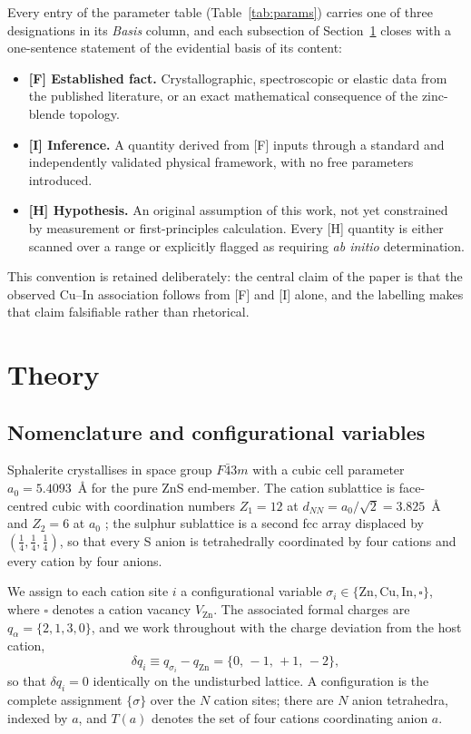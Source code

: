 \documentclass[11pt,a4paper]{article}
\begin{document}
Every entry of the parameter table (Table~\ref{tab:params}) carries one of three
designations in its \emph{Basis} column, and each subsection of
Section~\ref{sec:theory} closes with a one-sentence statement of the evidential
basis of its content:
\begin{itemize}\itemsep1pt
\item \textbf{[F] Established fact.} Crystallographic, spectroscopic or elastic
      data from the published literature, or an exact mathematical consequence
      of the zinc-blende topology.
\item \textbf{[I] Inference.} A quantity derived from [F] inputs through a
      standard and independently validated physical framework, with no free
      parameters introduced.
\item \textbf{[H] Hypothesis.} An original assumption of this work, not yet
      constrained by measurement or first-principles calculation. Every [H]
      quantity is either scanned over a range or explicitly flagged as requiring
      \textit{ab initio} determination.
\end{itemize}
This convention is retained deliberately: the central claim of the paper is that
the observed Cu--In association follows from [F] and [I] alone, and the
labelling makes that claim falsifiable rather than rhetorical.

\section{Theory}
\label{sec:theory}

\subsection{Nomenclature and configurational variables}

Sphalerite crystallises in space group $F\bar{4}3m$ with a cubic cell parameter
$a_0 = 5.4093$~\AA{} for the pure ZnS end-member. The cation sublattice is
face-centred cubic with coordination numbers $Z_1 = 12$ at
$d_{NN} = a_0/\sqrt{2} = 3.825$~\AA{} and $Z_2 = 6$ at $a_0$ \citep{shannon1976};
the sulphur sublattice is a second fcc array displaced by
$(\tfrac14,\tfrac14,\tfrac14)$, so that every S anion is tetrahedrally
coordinated by four cations and every cation by four anions.

We assign to each cation site $i$ a configurational variable
$\sigma_i \in \{\mathrm{Zn}, \mathrm{Cu}, \mathrm{In}, \square\}$, where
$\square$ denotes a cation vacancy $V_{\mathrm{Zn}}$. The associated formal
charges are $q_\alpha = \{2, 1, 3, 0\}$, and we work throughout with the charge
deviation from the host cation,
\begin{equation}
\delta q_i \equiv q_{\sigma_i} - q_{\mathrm{Zn}} = \{0,\, -1,\, +1,\, -2\},
\end{equation}
so that $\delta q_i = 0$ identically on the undisturbed lattice. A configuration
is the complete assignment $\{\sigma\}$ over the $N$ cation sites; there are $N$
anion tetrahedra, indexed by $a$, and $T(a)$ denotes the set of four cations
coordinating anion $a$.
\end{document}
